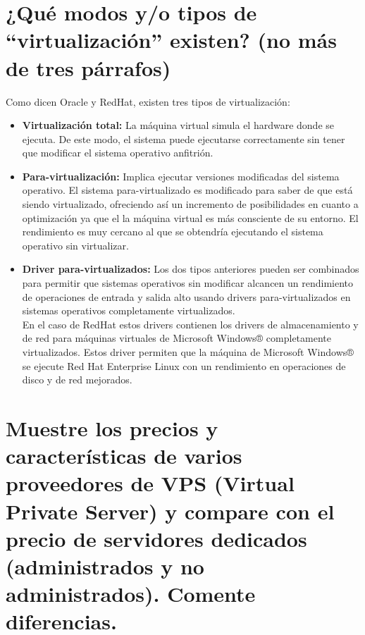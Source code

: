 \documentclass[a4paper,titlepage,12pt]{scrartcl}	%
\numberwithin{figure}{section} %
\numberwithin{table}{section} %
\begin{document}
	\tableofcontents
	\clearpage
	\listoffigures %
	\clearpage
	\listoftables %
	\clearpage
	
	\section[¿Qué modos y/o tipos de “virtualización” existen? (no más de tres párrafos)]{¿Qué modos y/o tipos de “virtualización” existen? (no más de tres párrafos)}
	
	Como dicen Oracle y RedHat, existen tres tipos de virtualización: \cite{VirtualizacionOracle} \cite{VirtualizacionRH}
	
	\begin{itemize}
		\item \textbf{Virtualización total: }
		La máquina virtual simula el hardware donde se ejecuta. De este modo, el sistema puede ejecutarse correctamente sin tener que modificar el sistema operativo anfitrión.		
		
		\item \textbf{Para-virtualización: } Implica ejecutar versiones modificadas del sistema operativo. El sistema para-virtualizado es modificado para saber de que está siendo virtualizado, ofreciendo así un incremento de posibilidades en cuanto a optimización ya que el la máquina virtual es más consciente de su entorno. El rendimiento es muy cercano al que se obtendría ejecutando el sistema operativo sin virtualizar.
		
		\item \textbf{Driver para-virtualizados: } Los dos tipos anteriores pueden ser combinados para permitir que sistemas operativos sin modificar alcancen un rendimiento de operaciones de entrada y salida alto usando drivers para-virtualizados en sistemas operativos completamente virtualizados. \\
		En el caso de RedHat \cite{VirtualizacionRH} estos drivers contienen los drivers de almacenamiento y de red para máquinas virtuales de Microsoft Windows® completamente virtualizados. Estos driver permiten que la máquina de Microsoft Windows® se ejecute Red Hat Enterprise Linux con un rendimiento en operaciones de disco y de red mejorados.
	\end{itemize}
	
	\section[Muestre los precios y características de varios proveedores de VPS (Virtual Private Server) y compare con el precio de servidores dedicados (administrados y no administrados). Comente diferencias.]{Muestre los precios y características de varios proveedores de VPS (Virtual Private Server) y compare con el precio de servidores dedicados (administrados y no administrados). Comente diferencias.}
	
\end{document}
